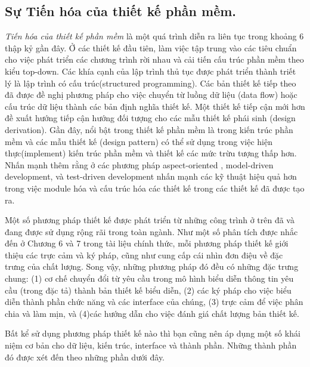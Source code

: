 \documentclass[./../SoftwareEngineering.tex]{subfiles}
\begin{document}
	\subsection{Sự Tiến hóa của thiết kế phần mềm.}
	\textit{Tiến hóa của thiết kế phần mềm} là một quá trình diễn ra liên tục trong khoảng 6 thập kỷ gần đây. Ở các thiết kế đầu tiên, làm việc tập trung vào các tiêu chuẩn cho việc phát triển các chương trình rời nhau và cải tiến cấu trúc phần mềm theo kiểu top-down. Các khía cạnh của lập trình thủ tục được phát triển thành triết lý là lập trình có cấu trúc(structured programming). Các bản thiết kế tiếp theo đã được đề nghị phương pháp cho việc chuyển từ luồng dữ liệu (data flow) hoặc cấu trúc dữ liệu thành các bản định nghĩa thiết kế. Một thiết kế tiếp cận mới hơn đề xuất hướng tiếp cận hướng đối tượng cho các mẫu thiết kế phái sinh (design derivation). Gần đây, nổi bật trong thiết kế phần mềm là trong kiến trúc phần mềm \cites{Kru06} và các mẫu thiết kế (design pattern) có thể sử dụng trong việc hiện thực(implement) kiến trúc phần mềm và thiết kế các mức trừu tượng thấp hơn. Nhấn mạnh thêm rằng ở các phương pháp aspect-oriented , model-driven development, và test-driven development nhấn mạnh các kỹ thuật hiệu quả hơn trong việc module hóa và cấu trúc hóa các thiết kế trong các thiết kế đã được tạo ra. 
	
	
	Một số phương pháp thiết kế được phát triển từ những công trình ở trên đã và đang được sử dụng rộng rãi trong toàn ngành. Như một số phân tích được nhắc đến ở Chương 6 và 7 trong tài liệu chính thức, mỗi phương pháp thiết kế giới thiệu các trực cảm và ký pháp, cũng như cung cấp cái nhìn đơn điệu về đặc trưng của chất lượng. Song vậy, những phương pháp đó đều có những đặc trưng chung: (1) cơ chế chuyển đổi từ yêu cầu trong mô hình biểu diễn thông tin yêu cầu (trong đặc tả) thành bản thiết kế biểu diễn, (2) các ký pháp cho việc biểu diễn thành phần chức năng và các interface của chúng, (3) trực cảm để việc phân chia và làm mịn, và (4)các hướng dẫn cho việc đánh giá chất lượng bản thiết kế.
	
Bất kể sử dụng phương pháp thiết kế nào thì bạn cũng nên áp dụng một số khái niệm cơ bản cho dữ liệu, kiến trúc, interface và thành phần. Những thành phần đó được xét đến theo những phần dưới đây.
	
\end{document}
